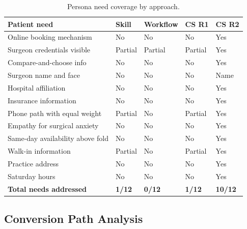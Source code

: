 \documentclass[a4paper]{llncs}
\begin{document}
\begin{table}[ht]
\caption{Persona need coverage by approach.}
\label{tab:coverage}
\centering
\small
\begin{tabular}{>{\raggedright\arraybackslash}p{5.2cm}>{\centering\arraybackslash}p{1.2cm}>{\centering\arraybackslash}p{1.4cm}>{\centering\arraybackslash}p{1.1cm}>{\centering\arraybackslash}p{1.2cm}}
\toprule
Patient need & Skill & Workflow & CS R1 & CS R2 \\
\midrule
Online booking mechanism & No & No & No & Yes \\
Surgeon credentials visible & Partial & Partial & Partial & Yes \\
Compare-and-choose info & No & No & No & Yes \\
Surgeon name and face & No & No & No & Name\footnotemark \\
Hospital affiliation & No & No & No & Yes \\
Insurance information & No & No & No & Yes \\
Phone path with equal weight & Partial & No & Partial & Yes \\
Empathy for surgical anxiety & No & No & No & Yes \\
Same-day availability above fold & No & No & No & Yes \\
Walk-in information & Partial & No & Partial & Yes \\
Practice address & No & No & No & Yes \\
Saturday hours & No & No & No & Yes \\
\textbf{Total needs addressed} & \textbf{1/12} & \textbf{0/12} & \textbf{1/12}
& \textbf{10/12} \\
\bottomrule
\end{tabular}
\end{table}

\subsection{Conversion Path Analysis}
\label{subsec:conversion}
\end{document}
